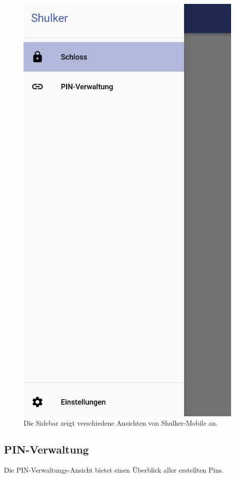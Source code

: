 \begin{figure}[H]
    \begin{center}
        \includegraphics[width=.6\textwidth]{images/mobile/Sidenav.png}
        \caption{Die Sidebar zeigt verschiedene Ansichten von Shulker-Mobile an.}
    \end{center}
\end{figure}

\subsection{PIN-Verwaltung}
Die PIN-Verwaltungs-Ansicht bietet einen Überblick aller erstellten Pins.

